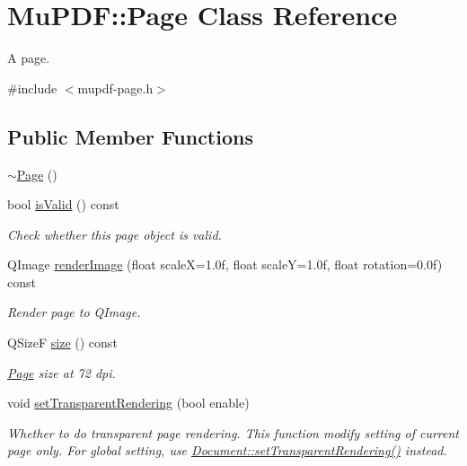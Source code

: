 \hypertarget{class_mu_p_d_f_1_1_page}{\section{Mu\-P\-D\-F\-:\-:Page Class Reference}
\label{class_mu_p_d_f_1_1_page}
}


A page.  




{\ttfamily \#include $<$mupdf-\/page.\-h$>$}

\subsection*{Public Member Functions}
\begin{DoxyCompactItemize}
\item 
\hyperlink{class_mu_p_d_f_1_1_page_af319e925b5460b6b09a40aacd1d68347}{$\sim$\-Page} ()
\item 
bool \hyperlink{class_mu_p_d_f_1_1_page_a1f60d3a284731ac220a8717eb6a93167}{is\-Valid} () const 
\begin{DoxyCompactList}\small\item\em Check whether this page object is valid. \end{DoxyCompactList}\item 
Q\-Image \hyperlink{class_mu_p_d_f_1_1_page_abdd1b94b296ea263190b53640168a77b}{render\-Image} (float scale\-X=1.\-0f, float scale\-Y=1.\-0f, float rotation=0.\-0f) const 
\begin{DoxyCompactList}\small\item\em Render page to Q\-Image. \end{DoxyCompactList}\item 
Q\-Size\-F \hyperlink{class_mu_p_d_f_1_1_page_a79b644e18279956b52d76aa8a492f62b}{size} () const 
\begin{DoxyCompactList}\small\item\em \hyperlink{class_mu_p_d_f_1_1_page}{Page} size at 72 dpi. \end{DoxyCompactList}\item 
void \hyperlink{class_mu_p_d_f_1_1_page_ac6768d64b88de1ccdd1fa0abb2724db0}{set\-Transparent\-Rendering} (bool enable)
\begin{DoxyCompactList}\small\item\em Whether to do transparent page rendering. This function modify setting of current page only. For global setting, use \hyperlink{class_mu_p_d_f_1_1_document_a8df89d0517437182406e2ba766402a3c}{Document\-::set\-Transparent\-Rendering()} instead. \end{DoxyCompactList}\item 

\end{DoxyCompactItemize}
